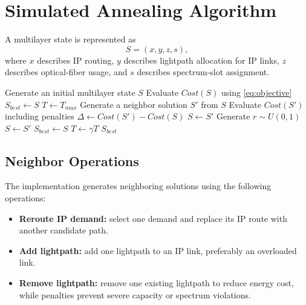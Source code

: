 \documentclass[journal,10pt]{IEEEtran}
\begin{document}
\section{Simulated Annealing Algorithm}

A multilayer state is represented as
\begin{equation}
    S = (x,y,z,s),
\end{equation}
where $x$ describes IP routing, $y$ describes lightpath allocation for IP links, $z$ describes optical-fiber usage, and $s$ describes spectrum-slot assignment.

\begin{algorithm}[t]
\caption{Penalty-Based Simulated Annealing for Cross-Layer Optimization}
\label{alg:sa}
\begin{algorithmic}[1]
\State Generate an initial multilayer state $S$
\State Evaluate $Cost(S)$ using \eqref{eq:objective}
\State $S_{best} \gets S$
\State $T \gets T_{max}$
        \State Generate a neighbor solution $S'$ from $S$
        \State Evaluate $Cost(S')$ including penalties
        \State $\Delta \gets Cost(S') - Cost(S)$
            \State $S \gets S'$
        \Else
            \State Generate $r\sim U(0,1)$
                \State $S \gets S'$
            \EndIf
        \EndIf
            \State $S_{best} \gets S$
        \EndIf
    \EndFor
    \State $T \gets \gamma T$
\EndWhile
\State \Return $S_{best}$
\end{algorithmic}
\end{algorithm}

\subsection{Neighbor Operations}

The implementation generates neighboring solutions using the following operations:
\begin{itemize}
    \item \textbf{Reroute IP demand:} select one demand and replace its IP route with another candidate path.
    \item \textbf{Add lightpath:} add one lightpath to an IP link, preferably an overloaded link.
    \item \textbf{Remove lightpath:} remove one existing lightpath to reduce energy cost, while penalties prevent severe capacity or spectrum violations.
\end{itemize}
\end{document}
